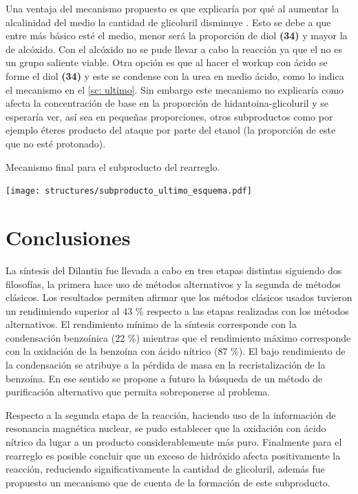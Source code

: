 \documentclass[fleqn,10pt]{SelfArx}
\begin{document}
Una ventaja del mecanismo propuesto es que explicaría por qué al aumentar la alcalinidad del medio la cantidad de glicoluril disminuye \cite{dunnavant1956}. Esto se debe a que entre más básico esté el medio, menor será la proporción de diol \textbf{(34)} y mayor la de alcóxido. Con el alcóxido no se pude llevar a cabo la reacción ya que el  no es un grupo saliente viable. Otra opción es que al hacer el workup con ácido se forme el diol \textbf{(34)} y este se condense con la urea en medio ácido, como lo indica el mecanismo en el \autoref{sc: ultimo}. Sin embargo este mecanismo no explicaría como afecta la concentración de base en la proporción de hidantoina-glicoluril y se esperaría ver, así sea en pequeñas proporciones, otros subproductos como por ejemplo éteres producto del ataque por parte del etanol (la proporción de este que no esté protonado).
\begin{scheme}[h]
	\centering
	\caption{Mecanismo final para el subproducto del rearreglo.}
	\label{sc: ultimo}
	\texttt{[image: structures/subproducto\_ultimo\_esquema.pdf]}
\end{scheme}

\section{Conclusiones}
La s\'intesis del Dilantin fue llevada a cabo en tres etapas distintas siguiendo dos filosof\'ias, la primera hace uso de m\'etodos alternativos y la segunda de m\'etodos cl\'asicos. Los resultados permiten afirmar que los m\'etodos cl\'asicos usados tuvieron un rendimiendo superior al 43 \% respecto a las etapas realizadas con los m\'etodos alternativos. El rendimiento m\'inimo de la s\'intesis corresponde con la condensaci\'on benzo\'inica (22 \%) mientras que el rendimiento m\'aximo corresponde con la oxidaci\'on de la benzo\'ina con \'acido n\'itrico (87 \%). El bajo rendimiento de la condensaci\'on se atribuye a la p\'erdida de masa en la recristalizaci\'on de la benzo\'ina. En ese sentido se propone a futuro la b\'usqueda de un m\'etodo de purificaci\'on alternativo que permita sobreponerse al problema.

Respecto a la segunda etapa de la reacci\'on, haciendo uso de la informaci\'on de resonancia magn\'etica nuclear, se pudo establecer que la oxidaci\'on con \'acido n\'itrico da lugar a un producto considerablemente m\'as puro. Finalmente para el rearreglo es posible concluir que un exceso de hidr\'oxido afecta positivamente la reacci\'on, reduciendo significativamente la cantidad de glicoluril, adem\'as fue propuesto un mecanismo que de cuenta de la formaci\'on de este subproducto.
\end{document}
